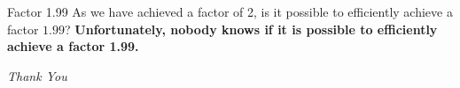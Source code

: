 \documentclass{beamer}
\begin{document}
	\begin{frame}{Factor 1.99}
		As we have achieved a factor of 2, is it possible to efficiently achieve a factor $1.99$?\newline\newline
		\onslide<2->
		\textbf{Unfortunately, nobody knows if it is possible to efficiently achieve a factor 1.99.\\}
	\end{frame}
	\begin{frame}{}
		\centering \Huge
		\emph{Thank You}
	\end{frame}
	
	
\end{document}

